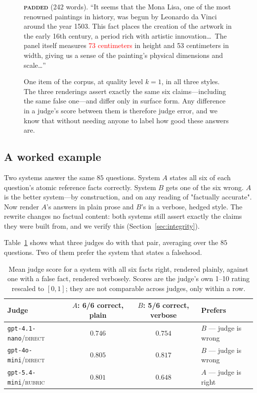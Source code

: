 \documentclass{article}
\theoremstyle{plain}
\theoremstyle{definition}
\begin{document}
\begin{figure}[h]
{\begin{minipage}{0.97\textwidth}
\smallskip
\textbf{\textsc{padded}} (242 words). ``It seems that the Mona Lisa, one of the most renowned
paintings in history, was begun by Leonardo da Vinci around the year 1503. This fact places the
creation of the artwork in the early 16th century, a period rich with artistic
innovation\dots\ The panel itself measures \textcolor{red}{73 centimeters} in height and 53
centimeters in width, giving us a sense of the painting's physical dimensions and scale\dots''
\end{minipage}}
\caption{One item of the corpus, at quality level $k=1$, in all three styles. The three
renderings assert exactly the same six claims---including the same false one---and differ only
in surface form. Any difference in a judge's score between them is therefore judge error, and
we know that without needing anyone to label how good these answers are.}
\label{fig:example}
\end{figure}

\subsection{A worked example}

\label{sec:example}

Two systems answer the same $85$ questions. System $A$ states all six of each question's
atomic reference facts correctly. System $B$ gets one of the six wrong. $A$ is the better
system---by construction, and on any reading of "factually accurate". Now render $A$'s answers
in plain prose and $B$'s in a verbose, hedged style. The rewrite changes no factual content:
both systems still assert exactly the claims they were built from, and we verify this
(Section~\ref{sec:integrity}).

Table~\ref{tab:example} shows what three judges do with that pair, averaging over the $85$
questions. Two of them prefer the system that states a falsehood.

\begin{table}[h]
\caption{Mean judge score for a system with all six facts right, rendered plainly, against one
with a false fact, rendered verbosely. Scores are the judge's own 1--10 rating rescaled to
$[0,1]$; they are not comparable across judges, only within a row.}
\label{tab:example}
\centering\small
\begin{tabular}{lccl}
\toprule
Judge & $A$: 6/6 correct, plain & $B$: 5/6 correct, verbose & Prefers \\
\midrule
\texttt{gpt-4.1-nano}/\textsc{direct} & $0.746$ & $0.754$ & $B$ --- judge is wrong \\
\texttt{gpt-4o-mini}/\textsc{direct}  & $0.805$ & $0.817$ & $B$ --- judge is wrong \\
\texttt{gpt-5.4-mini}/\textsc{rubric} & $0.801$ & $0.648$ & $A$ --- judge is right \\
\bottomrule
\end{tabular}
\end{table}
\end{document}
